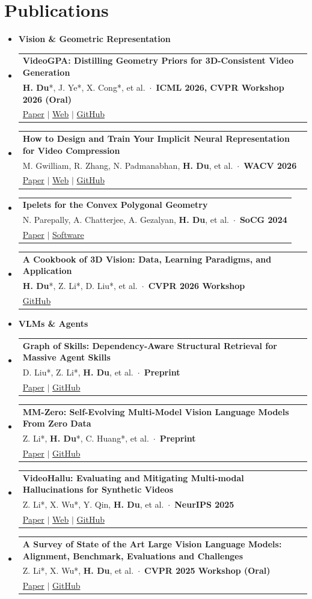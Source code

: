 \documentclass[letterpaper,11pt]{article}
\makeatletter
\newcommand{\resumePublicationEntry}[4]{%
  \vspace{-5pt}\item
  \begin{tabular*}{0.97\textwidth}[t]{@{}p{0.97\textwidth}@{}}
    \raggedright\textbf{#1} \\
    \raggedright\small
      #2\ $\cdot$\ \textbf{#3} \\
    \raggedright\small
      #4 \\
  \end{tabular*}\vspace{-7pt}
}
\newcommand{\resumePublicationGroup}[1]{%
  \vspace{1pt}\item
  \textbf{\small #1}\vspace{-4pt}
}
\newcommand{\resumeSubHeadingListStart}{\begin{itemize}[leftmargin=0.1in, label={}]}
\newcommand{\resumeSubHeadingListEnd}{\end{itemize}}
\makeatother
\begin{document}
\section{Publications}
  \resumeSubHeadingListStart
    \resumePublicationGroup{Vision \& Geometric Representation}
    \resumePublicationEntry
      {VideoGPA: Distilling Geometry Priors for 3D-Consistent Video Generation}
      {\textbf{H. Du}*, J. Ye*, X. Cong*, et al.}
      {ICML 2026, CVPR Workshop 2026 (Oral)}
      {\href{https://arxiv.org/abs/2601.23286}{Paper} $\mid$ \href{https://hongyang-du.github.io/VideoGPA-Website/}{Web} $\mid$ \href{https://github.com/Hongyang-Du/VideoGPA}{GitHub}}
    \resumePublicationEntry
      {How to Design and Train Your Implicit Neural Representation for Video Compression}
      {M. Gwilliam, R. Zhang, N. Padmanabhan, \textbf{H. Du}, et al.}
      {WACV 2026}
      {\href{https://arxiv.org/abs/2506.24127}{Paper} $\mid$ \href{https://mgwillia.github.io/vinrb/}{Web} $\mid$ \href{https://github.com/mgwillia/vinrb}{GitHub}}
    \resumePublicationEntry
      {Ipelets for the Convex Polygonal Geometry}
      {N. Parepally, A. Chatterjee, A. Gezalyan, \textbf{H. Du}, et al.}
      {SoCG 2024}
      {\href{https://drops.dagstuhl.de/entities/document/10.4230/LIPIcs.SoCG.2024.92}{Paper} $\mid$ \href{https://archive.softwareheritage.org/browse/directory/9bd3fa80632acd54ba70aaa6d413da809ef3d73d/?origin_url=https://github.com/GeneralCoder365/umd_ipelets\&revision=a192a2a0ed086dee45ac6823bcd7892efcbabfe7\&snapshot=4669f223bd0bd8b718bbc43fb7fe8eb5e4014aa6}{Software}}
    \resumePublicationEntry
      {A Cookbook of 3D Vision: Data, Learning Paradigms, and Application}
      {\textbf{H. Du}*, Z. Li*, D. Liu*, et al.}
      {CVPR 2026 Workshop}
      {\href{https://github.com/Hongyang-Du/awesome-3d-datasets}{GitHub}}
    \resumePublicationGroup{VLMs \& Agents}
    \resumePublicationEntry
      {Graph of Skills: Dependency-Aware Structural Retrieval for Massive Agent Skills}
      {D. Liu*, Z. Li*, \textbf{H. Du}, et al.}
      {Preprint}
      {\href{https://arxiv.org/abs/2604.05333}{Paper} $\mid$ \href{https://github.com/davidliuk/graph-of-skills}{GitHub}}
    \resumePublicationEntry
      {MM-Zero: Self-Evolving Multi-Model Vision Language Models From Zero Data}
      {Z. Li*, \textbf{H. Du}*, C. Huang*, et al.}
      {Preprint}
      {\href{https://arxiv.org/abs/2603.09206}{Paper} $\mid$ \href{https://github.com/zli12321/MM-Zero}{GitHub}}
    \resumePublicationEntry
      {VideoHallu: Evaluating and Mitigating Multi-modal Hallucinations for Synthetic Videos}
      {Z. Li*, X. Wu*, Y. Qin, \textbf{H. Du}, et al.}
      {NeurIPS 2025}
      {\href{https://arxiv.org/abs/2505.01481}{Paper} $\mid$ \href{https://wuxiyang1996.github.io/videohallu_page/}{Web} $\mid$ \href{https://github.com/zli12321/VideoHallu}{GitHub}}
    \resumePublicationEntry
      {A Survey of State of the Art Large Vision Language Models: Alignment, Benchmark, Evaluations and Challenges}
      {Z. Li*, X. Wu*, \textbf{H. Du}, et al.}
      {CVPR 2025 Workshop (Oral)}
      {\href{https://openaccess.thecvf.com/content/CVPR2025W/TMM-OpenWorld/html/Li_A_Survey_of_State_of_the_Art_Large_Vision_Language_CVPRW_2025_paper.html}{Paper} $\mid$ \href{https://github.com/zli12321/Awesome-VLM-Papers-And-Models}{GitHub}}
  \resumeSubHeadingListEnd
\end{document}
